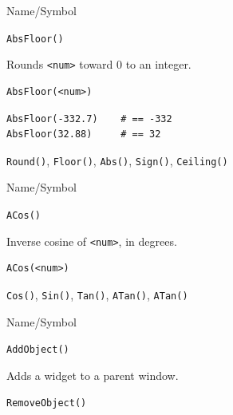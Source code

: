 \begin{desc}{Name/Symbol}

\item[Name/Symbol]  	\verb+AbsFloor()+

\item[Description]  	Rounds \verb+<num>+ toward 0 to an integer.

\item[Usage]       	
\begin{verbatim}
AbsFloor(<num>)
\end{verbatim}

\item[Example]
\begin{verbatim}
AbsFloor(-332.7)   	# == -332
AbsFloor(32.88)    	# == 32
\end{verbatim}

\item[See Also]     	\verb+Round()+, \verb+Floor()+, \verb+Abs()+, \verb+Sign()+, \verb+Ceiling()+
\end{desc}




\begin{desc}{Name/Symbol}

\item[Name/Symbol] 	\verb+ACos()+ 

\item[Description]  	Inverse cosine of \verb+<num>+, in degrees.

\item[Usage]
\begin{verbatim}
ACos(<num>)
\end{verbatim}

\item[Example]	

\item[See Also]    	\verb+Cos()+, \verb+Sin()+, \verb+Tan()+, \verb+ATan()+, \verb+ATan()+ 

\end{desc}


 


\begin{desc}{Name/Symbol}

\item[Name/Symbol]  	\verb+AddObject()+

\item[Description] 	Adds a widget to a parent window.

\item[Usage]		

\item[Example]	

\item[See Also]    	\verb+RemoveObject()+
\end{desc}





